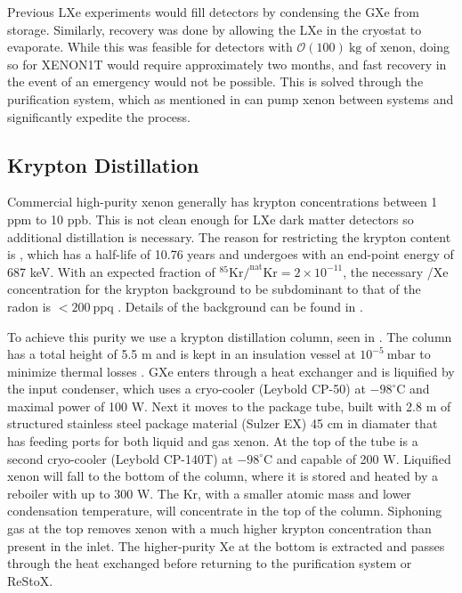 Previous LXe experiments would fill detectors by condensing the GXe from storage.  Similarly, recovery was done by allowing the LXe
in the cryostat to evaporate.  While this was feasible for detectors with $\mathcal{O}(100)\ \mathrm{kg}$ of xenon, doing so
for XENON1T would require approximately two months, and fast recovery in the event of an
emergency would not be possible.  This is solved through the purification system, which as mentioned in  can
pump xenon between systems and significantly expedite the process.



\subsection{Krypton Distillation}
\label{subsec:xenon1t_kr_dist}
Commercial high-purity xenon generally has krypton concentrations between 1 ppm to 10 ppb.  This is not clean enough for LXe dark matter
detectors so additional distillation is necessary.  The reason for restricting the
krypton content is , which has a half-life of 10.76 years and undergoes \betadecay with an end-point energy of 687
keV.  With an expected fraction of $\mathrm{^{85}Kr / ^{nat}Kr = 2 \times 10^{-11}}$, the necessary /Xe concentration for the
krypton background to be subdominant to that of the radon is $< 200\ \mathrm{ppq}$ .  Details of the 
background can be found in .

To achieve this purity we use a krypton distillation column, seen in .  The column has a total
height of 5.5 m and is kept in an insulation vessel at $10^{-5}\ \mathrm{mbar}$ to minimize thermal losses .  GXe
enters through a heat exchanger and is
liquified by the input condenser, which uses a cryo-cooler (Leybold CP-50) at $-98^{\circ}\mathrm{C}$ and maximal power
of 100 W.  Next it moves to the package tube, built with 2.8 m of structured stainless steel package material (Sulzer EX) 45 cm in
diamater that has feeding ports for both liquid and gas xenon.  At the top of the tube is a second cryo-cooler (Leybold CP-140T)
at $-98^{\circ}\mathrm{C}$ and capable of 200 W.  Liquified xenon will fall to the bottom of the column, where it is stored and heated by
a reboiler with up to 300 W.  The Kr, with a smaller atomic mass and lower condensation temperature, will concentrate in the top of the
column.  Siphoning gas at the top removes xenon with a much higher krypton concentration than
present in the inlet.  The higher-purity Xe at the bottom is extracted and passes through the heat exchanged before returning to the
purification system or ReStoX.

